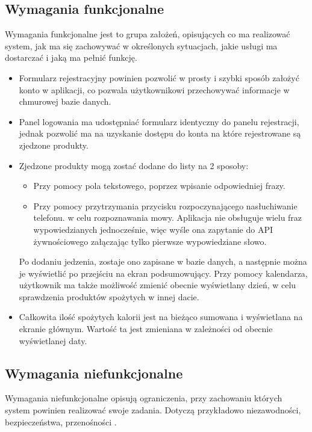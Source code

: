 \documentclass[12pt, a4paper]{article}
\begin{document}
\begin{sloppypar}
{  \subsection{Wymagania funkcjonalne}
  {
    Wymagania funkcjonalne jest to grupa założeń, opisujących co ma realizować system, 
    jak ma się zachowywać w określonych sytuacjach, jakie usługi ma dostarczać i jaką ma
    pełnić funkcję.

    \begin{itemize}
      \item Formularz rejestracyjny powinien pozwolić w prosty i szybki sposób założyć 
      konto w aplikacji, co pozwala użytkownikowi przechowywać informacje w 
      chmurowej bazie danych.
      \item Panel logowania ma udostępniać formularz identyczny do panelu rejestracji,
      jednak pozwolić ma na uzyskanie dostępu do konta na które rejestrowane są
      zjedzone produkty.
      \item Zjedzone produkty mogą zostać dodane do listy na 2 sposoby:
        \begin{itemize}
          \item Przy pomocy pola tekstowego, poprzez wpisanie odpowiedniej frazy.
          \item Przy pomocy przytrzymania przycisku rozpoczynającego nasłuchiwanie telefonu.
          w celu rozpoznawania mowy. Aplikacja nie obsługuje wielu fraz wypowiedzianych
          jednocześnie, więc wyśle ona zapytanie do API żywnościowego załączając tylko 
          pierwsze wypowiedziane słowo.
        \end{itemize}
        Po dodaniu jedzenia, zostaje ono zapisane w bazie danych, a następnie można je
        wyświetlić po przejściu na ekran podsumowujący. Przy pomocy kalendarza,
        użytkownik ma także możliwość zmienić obecnie wyświetlany dzień, w celu
        sprawdzenia produktów spożytych w innej dacie.
      \item Całkowita ilość spożytych kalorii jest na bieżąco sumowana i wyświetlana na
      ekranie głównym. Wartość ta jest zmieniana w zależności od obecnie wyświetlanej daty. 
    \end{itemize}
  }
  \subsection{Wymagania niefunkcjonalne}
  {
    Wymagania niefunkcjonalne opisują ograniczenia, przy zachowaniu których system
    powinien realizować swoje zadania. Dotyczą przykładowo niezawodności, bezpieczeństwa,
    przenośności \cite{funk-niefunk}.

}}
\end{sloppypar}
\end{document}
